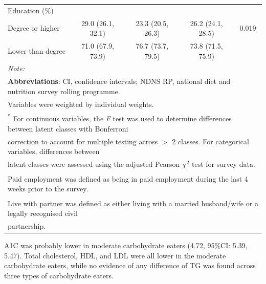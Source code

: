 \begin{table}[H]
\begin{tabular}[t]{lcccc}
	Education (\%) &  &  &  & \\
	\hspace{1em}Degree or higher & 29.0 (26.1, 32.1) & 23.3 (20.5, 26.3) & 26.2 (24.1, 28.5) & 0.019\\
	\hspace{1em}Lower than degree & 71.0 (67.9, 73.9) & 76.7 (73.7, 79.5) & 73.8 (71.5, 75.9) & \\
	\bottomrule
	\multicolumn{5}{l}{{\scriptsize \textit{Note: }}}\\
	\multicolumn{5}{l}{{\scriptsize \textbf{Abbreviations}: CI, confidence intervals; NDNS RP, national diet and nutrition survey rolling programme.}}\\
	\multicolumn{5}{l}{{\scriptsize Variables were weighted by individual weights.}}\\
	\multicolumn{5}{l}{{\scriptsize \textsuperscript{*} For continuous variables, the \textit{F} test was used to determine differences between latent classes with Bonferroni}}\\ 
	\multicolumn{5}{l}{{\scriptsize correction to account for multiple testing across $>$ 2 classes. For categorical variables, differences between}}\\
	\multicolumn{5}{l}{{\scriptsize  latent classes were assessed using the adjusted Pearson $\chi^2$ test for survey data.}} \\
	\multicolumn{5}{l}{{\scriptsize \textsuperscript{\dag} Paid employment was defined as being in paid employment during the last 4 weeks prior to the survey.} }\\
	\multicolumn{5}{l}{{\scriptsize \textsuperscript{\ddag} Live with partner was defined as either living with a married husband/wife or a legally recognised civil}} \\
	\multicolumn{5}{l}{{\scriptsize partnership.}}\\
\end{tabular}

\end{table} 

A1C was probably lower in moderate carbohydrate eaters (4.72, 95\%CI: 5.39, 5.47). Total cholesterol, HDL, and LDL were all lower in the moderate carbohydrate eaters, while no evidence of any difference of TG was found across three types of carbohydrate eaters. 






